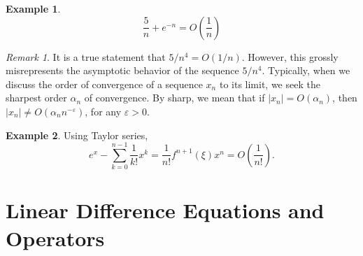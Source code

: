 \documentclass[12pt]{article}
\newcommand{\ee}{\varepsilon}
\theoremstyle{plain}
\theoremstyle{definition}
\newtheorem*{example}{Example}
\theoremstyle{remark}
\newtheorem*{remark}{Remark}
\numberwithin{equation}{section}  %
\begin{document}
\begin{example}
	\begin{equation*}
		\frac{5}{n} + e^{-n} = O\left( \frac{1}{n}\right)
	\end{equation*}
\end{example}

\begin{remark}
	It is a true statement that $5/n^4 = O(1/n)$. However, this grossly
	misrepresents the asymptotic behavior of the sequence $5/n^4$. Typically, when
	we discuss the order of convergence of a sequence $x_n$ to its limit, we seek
	the sharpest order $\alpha_n$ of convergence. By sharp, we mean that if $|x_n| =
	O(\alpha_n)$, then $|x_n| \neq O(\alpha_n n^{-\ee})$, for any $\ee > 0$.
\end{remark}

\begin{example}
	Using Taylor series,
	\begin{equation*}
		e^x - \sum_{k = 0}^{n-1} \frac{1}{k!}x^k = \frac{1}{n!} f^{n+1}(\xi)x^n =
		O\left(\frac{1}{n!}\right).
	\end{equation*}
\end{example}

\section{Linear Difference Equations and Operators}
\end{document}
